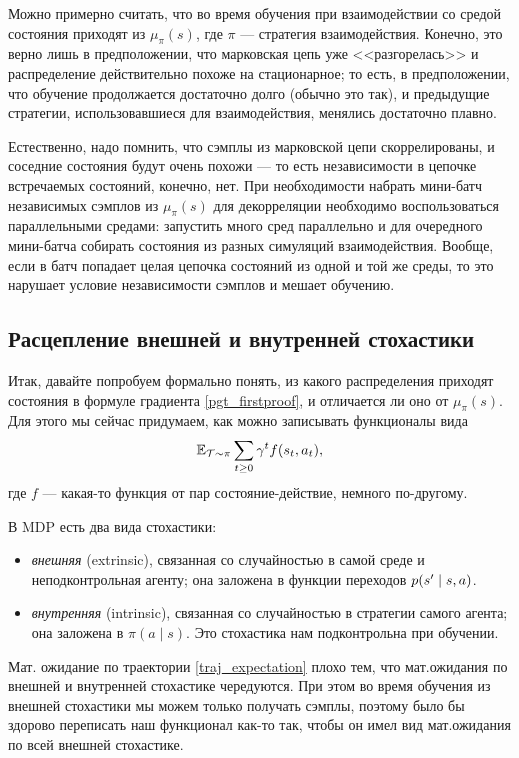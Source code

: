 Можно примерно считать, что во время обучения при взаимодействии со средой состояния приходят из $\mu_{\pi}(s)$, где $\pi$ --- стратегия взаимодействия. Конечно, это верно лишь в предположении, что марковская цепь уже <<разгорелась>> и распределение действительно похоже на стационарное; то есть, в предположении, что обучение продолжается достаточно долго (обычно это так), и предыдущие стратегии, использовавшиеся для взаимодействия, менялись достаточно плавно. 

Естественно, надо помнить, что сэмплы из марковской цепи скоррелированы, и соседние состояния будут очень похожи --- то есть независимости в цепочке встречаемых состояний, конечно, нет. При необходимости набрать мини-батч независимых сэмплов из $\mu_{\pi}(s)$ для декорреляции необходимо воспользоваться параллельными средами: запустить много сред параллельно и для очередного мини-батча собирать состояния из разных симуляций взаимодействия. Вообще, если в батч попадает целая цепочка состояний из одной и той же среды, то это нарушает условие независимости сэмплов и мешает обучению. 

\subsection{Расцепление внешней и внутренней стохастики}

Итак, давайте попробуем формально понять, из какого распределения приходят состояния в формуле градиента \eqref{pgt_firstproof}, и отличается ли оно от $\mu_{\pi}(s)$. Для этого мы сейчас придумаем, как можно записывать функционалы вида
$$\mathbb{E}_{\mathcal{T} \sim \pi} \sum_{t \ge 0} \gamma^t f(s_t, a_t),$$
где $f$ --- какая-то функция от пар состояние-действие, немного по-другому.

В MDP есть два вида стохастики:
\begin{itemize}
    \item \emph{внешняя} (extrinsic), связанная со случайностью в самой среде и неподконтрольная агенту; она заложена в функции переходов $p(s' \HM\mid s, a)$.
    \item \emph{внутренняя} (intrinsic), связанная со случайностью в стратегии самого агента; она заложена в $\pi(a \mid s)$. Это стохастика нам подконтрольна при обучении.
\end{itemize}

Мат. ожидание по траектории \eqref{traj_expectation} плохо тем, что мат.ожидания по внешней и внутренней стохастике чередуются. При этом во время обучения из внешней стохастики мы можем только получать сэмплы, поэтому было бы здорово переписать наш функционал как-то так, чтобы он имел вид мат.ожидания по всей внешней стохастике.

